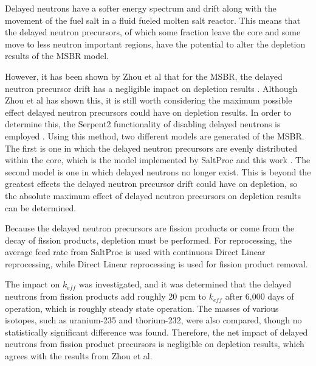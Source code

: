 Delayed neutrons have a softer energy spectrum and drift along with the movement of the fuel salt in a fluid fueled molten salt reactor. This means that the delayed neutron precursors, of which some fraction leave the core and some move to less neutron important regions, have the potential to alter the depletion results of the MSBR model.

However, it has been shown by Zhou et al that for the MSBR, the delayed neutron precursor drift has a negligible impact on depletion results \cite{zhou_fuel_2018}. Although Zhou et al has shown this, it is still worth considering the maximum possible effect delayed neutron precursors could have on depletion results. In order to determine this, the Serpent2 functionality of disabling delayed neutrons is employed \cite{leppanen_serpent_2015}. Using this method, two different models are generated of the MSBR. The first is one in which the delayed neutron precursors are evenly distributed within the core, which is the model implemented by SaltProc and this work \cite{rykhlevskii_modeling_2019}. The second model is one in which delayed neutrons no longer exist. This is beyond the greatest effects the delayed neutron precursor drift could have on depletion, so the absolute maximum effect of delayed neutron precursors on depletion results can be determined.

Because the delayed neutron precursors are fission products or come from the decay of fission products, depletion must be performed. For reprocessing, the average feed rate from SaltProc is used with continuous Direct Linear reprocessing, while Direct Linear reprocessing is used for fission product removal. 

The impact on $k_{eff}$ was investigated, and it was determined that the delayed neutrons from fission products add roughly 20 pcm to $k_{eff}$ after 6,000 days of operation, which is roughly steady state operation. The masses of various isotopes, such as uranium-235 and thorium-232, were also compared, though no statistically significant difference was found. Therefore, the net impact of delayed neutrons from fission product precursors is negligible on depletion results, which agrees with the results from Zhou et al.



